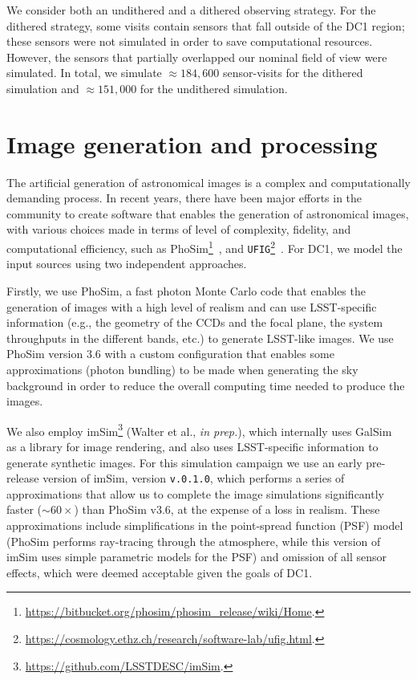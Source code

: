 \documentclass[a4paper,fleqn,usenatbib]{mnras}
\begin{document}
We consider both an undithered and a dithered observing strategy. For the dithered strategy, some visits contain sensors that fall outside of the DC1 region; these sensors were not simulated in order to save computational resources. However, the sensors that partially overlapped our nominal field of view were simulated. In total, we simulate $\approx 184,600$ sensor-visits for the dithered simulation and $\approx 151,000$ for the undithered simulation.


\section{Image generation and processing}
\label{sec:image_generation_pipeline}

The artificial generation of astronomical images is a complex and computationally demanding process. In recent
years, there have been major efforts in the community to create software that enables the generation of astronomical images, with various choices made in terms of level of complexity, fidelity, and computational efficiency, such as PhoSim\footnote{\url{https://bitbucket.org/phosim/phosim_release/wiki/Home}.}~\citep{2015ApJS..218...14P}, and \texttt{UFIG}\footnote{\url{https://cosmology.ethz.ch/research/software-lab/ufig.html}.}~\citep{2016ApJ...817...25B}. For DC1, we model the input sources using
two independent approaches. 

Firstly, we use PhoSim, a fast photon Monte Carlo code that enables the generation of images with a high level of realism and can use LSST-specific information (e.g., the geometry of the CCDs and the focal plane, the system throughputs in the different bands, etc.) to generate LSST-like images. We use PhoSim version 3.6 with a custom configuration that enables some
approximations (photon bundling) to be made when generating the sky background in order to reduce the overall computing time needed to produce the images.

We also employ imSim\footnote{\url{https://github.com/LSSTDESC/imSim}.} (Walter et al., {\em in prep.}), which internally uses GalSim~\citep{2015A&C....10..121R} as a library for image rendering, and also uses LSST-specific information to generate synthetic images. For this simulation campaign we use an early pre-release version of imSim, version \texttt{v.0.1.0}, which performs a series of approximations that allow us to complete the image simulations significantly faster ($\sim 60\times$) than PhoSim v3.6, at the expense of a loss in realism. These approximations include simplifications in the point-spread function (PSF) model (PhoSim performs ray-tracing through the atmosphere, while this version of imSim uses simple parametric models for the PSF) and omission of all sensor effects, which were deemed acceptable given the goals of DC1.
\end{document}
